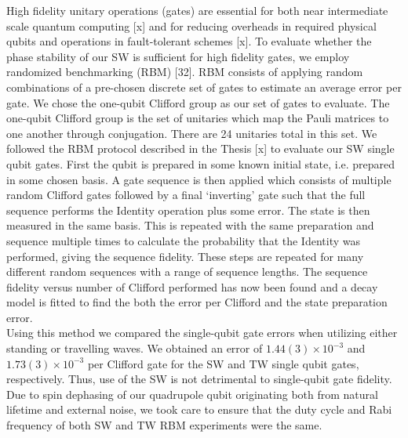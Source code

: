 \documentclass[12pt]{iopart}
\begin{document}
    High fidelity unitary operations (gates) are essential for both
    near intermediate scale quantum computing [x] and for reducing
    overheads in required physical qubits and operations in
    fault-tolerant schemes [x]. To evaluate whether the phase
    stability of our SW is sufficient for high fidelity gates, we
    employ randomized benchmarking (RBM) [32].  RBM consists of
    applying random combinations of a pre-chosen discrete set of gates
    to estimate an average error per gate.  We chose the one-qubit
    Clifford group as our set of gates to evaluate. The one-qubit
    Clifford group is the set of unitaries which map the Pauli
    matrices to one another through conjugation. There are 24
    unitaries total in this set. We followed the RBM protocol
    described in the Thesis [x] to evaluate our SW single qubit
    gates. First the qubit is prepared in some known initial state,
    i.e. prepared in some chosen basis. A gate sequence is then
    applied which consists of multiple random Clifford gates followed
    by a final `inverting' gate such that the full sequence performs
    the Identity operation plus some error. The state is then measured
    in the same basis. This is repeated with the same preparation and
    sequence multiple times to calculate the probability that the
    Identity was performed, giving the sequence fidelity. These
    steps are repeated for many different random sequences with a
    range of sequence lengths. The sequence fidelity versus number of
    Clifford performed has now been found and a decay model is fitted
    to find the both the error per Clifford and the state preparation
    error.\\
    Using this method we compared the single-qubit gate errors when
    utilizing either standing or travelling waves. We obtained an
    error of $1.44(3) \times 10^{-3}$ and $1.73(3) \times 10^{-3}$ per
    Clifford gate for the SW and TW single qubit gates,
    respectively. Thus, use of the SW is not detrimental to
    single-qubit gate fidelity. Due to spin dephasing of our
    quadrupole qubit originating both from natural lifetime and
    external noise, we took care to ensure that the duty cycle and
    Rabi frequency of both SW and TW RBM experiments were the same. \\





\end{document}
